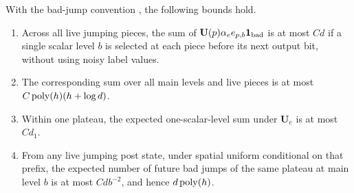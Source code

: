 \begin{lemma}\label{lemma:07-edge-charges}
With the bad-jump convention , the following
bounds hold.
\begin{enumerate}[label=\textup{(\roman*)}]
\item Across all live jumping pieces, the sum of
$\mathbf U(p)\alpha_e e_{p,b}\mathbf1_{\rm bad}$ is at most $Cd$ if a
single scalar level $b$ is selected at each piece before its next output
bit, without using noisy label values.
\item The corresponding sum over all main levels and live pieces is at
most $C\operatorname{poly}(h)(h+\log d)$.
\item Within one plateau, the expected one-scalar-level sum under
$\mathbf U_e$ is at most $Cd_1$.
\item From any live jumping post state, under spatial uniform conditional
on that prefix, the expected number of future bad jumps of the same plateau
at main level $b$ is at most $Cd b^{-2}$, and hence $d\operatorname{poly}(h)$.
\end{enumerate}
\end{lemma}

